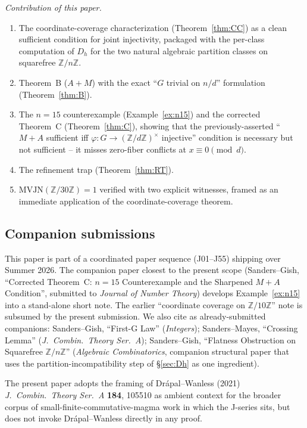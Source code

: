 \documentclass[11pt,reqno]{amsart}
\theoremstyle{plain}
\theoremstyle{definition}
\newcommand{\Z}{\mathbb{Z}}
\newcommand{\Zn}{\Z/n\Z}
\begin{document}
\emph{Contribution of this paper.}
\begin{enumerate}[label=(\roman*)]
\item The coordinate-coverage characterization
(Theorem~\ref{thm:CC}) as a clean sufficient condition for joint
injectivity, packaged with the per-class computation of $D_h$ for the
two natural algebraic partition classes on squarefree $\Zn$.
\item Theorem~B ($A{+}M$) with the exact ``$G$ trivial on $n/d$''
formulation (Theorem~\ref{thm:B}).
\item The $n = 15$ counterexample (Example~\ref{ex:n15}) and the
corrected Theorem~C (Theorem~\ref{thm:C}), showing that the
previously-asserted ``$M{+}A$ sufficient iff
$\varphi: G \to (\Z/d\Z)^{\times}$ injective'' condition is
necessary but not sufficient -- it misses zero-fiber conflicts at
$x \equiv 0 \pmod d$.
\item The refinement trap (Theorem~\ref{thm:RT}).
\item $\mathrm{MVJN}(\Z/30\Z) = 1$ verified with two explicit
witnesses, framed as an immediate application of the
coordinate-coverage theorem.
\end{enumerate}

\subsection{Companion submissions} \label{ssec:companions}

This paper is part of a coordinated paper sequence (J01--J55) shipping
over Summer 2026. The companion paper closest to the present scope
(Sanders--Gish, ``Corrected Theorem~C: $n = 15$ Counterexample and
the Sharpened $M{+}A$ Condition'', submitted to \emph{Journal of
Number Theory}) develops Example~\ref{ex:n15} into a stand-alone
short note. The earlier ``coordinate coverage on
$\Z/10\Z$'' note is subsumed by the present submission. We also
cite as already-submitted companions: Sanders--Gish, ``First-G Law''
(\emph{Integers}); Sanders--Mayes, ``Crossing Lemma''
(\emph{J.\ Combin.\ Theory Ser.\ A}); Sanders--Gish, ``Flatness
Obstruction on Squarefree $\Z/n\Z$'' (\emph{Algebraic Combinatorics},
companion structural paper that uses the partition-incompatibility
step of \S\ref{sec:Dh} as one ingredient).

The present paper adopts the framing of Dr\'apal--Wanless (2021)
\emph{J.\ Combin.\ Theory Ser.\ A} \textbf{184}, 105510 as ambient
context for the broader corpus of small-finite-commutative-magma
work in which the J-series sits, but does not invoke
Dr\'apal--Wanless directly in any proof.
\end{document}
